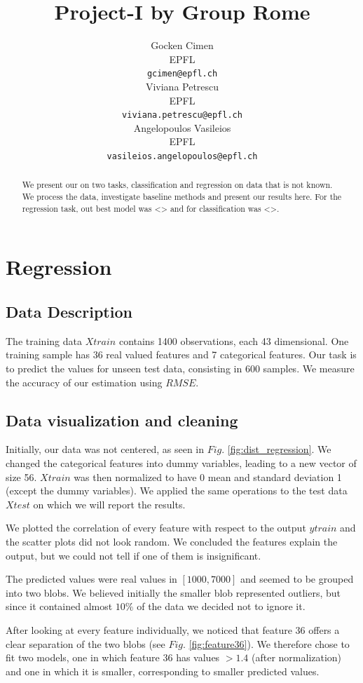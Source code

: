 \documentclass{article} %
\title{Project-I by Group Rome}
\author{
Gocken Cimen\\
EPFL \\
\texttt{gcimen@epfl.ch} \\
\And
Viviana Petrescu\\
EPFL \\
\texttt{viviana.petrescu@epfl.ch} \\
\And
Angelopoulos Vasileios \\
EPFL \\
\texttt{vasileios.angelopoulos@epfl.ch} \\
}
\begin{document}
\maketitle

\begin{abstract}
We present our on two tasks, classification and regression on data that is not known. We process the data, investigate baseline methods and present our results here.
For the regression task, out best model was <> and for classification was <>.
\end{abstract}

\section{Regression}
\subsection{Data Description}
The training data $Xtrain$ contains 1400 observations, each 43 dimensional. One training sample has 36 real valued features and 7 categorical features. Our task is to predict the values for unseen test data, consisting in 600 samples. We measure the accuracy of our estimation using $RMSE$. 

\subsection{Data visualization and cleaning}
Initially, our data was not centered, as seen in $Fig.$ \ref{fig:dist_regression}.
We changed the categorical features into dummy variables, leading to a new vector of size 56. $Xtrain$ was then normalized to have 0 mean and standard deviation 1 (except the dummy variables). We applied the same operations to the test data $Xtest$ on which we will report the results.

 We plotted the correlation of every feature with respect to the output $ytrain$ and the scatter plots did not look random. We concluded the features explain the output, but we could not tell if one of them is insignificant.

The predicted values were real values in $[1000,7000]$ and seemed to be grouped into two blobs. We believed initially the smaller blob represented outliers, but since it contained almost $10\%$ of the data we decided not to ignore it.

After looking at every feature individually, we noticed that feature 36 offers a clear separation of the two blobs (see $Fig.$ \ref{fig:feature36}). We therefore chose to fit two models, one in which feature 36 has values $>1.4$ (after normalization) and one in which it is smaller, corresponding to smaller predicted values. 
\end{document}

